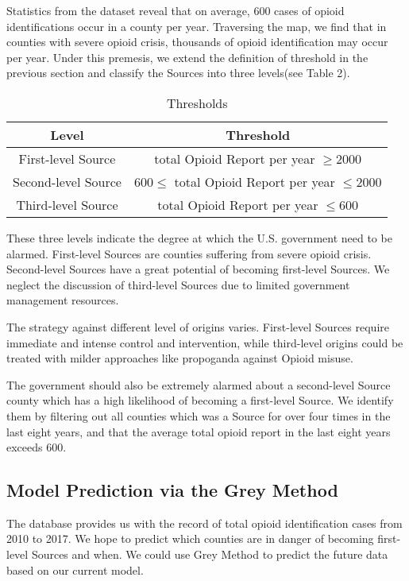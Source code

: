 Statistics from the dataset reveal that on average, 600 cases of opioid identifications occur in a county per year. Traversing the map, we find that in counties with severe opioid crisis, thousands of opioid identification may occur per year. Under this premesis, we extend the definition of threshold in the previous section and classify the Sources into three levels(see Table 2).


\begin{table}[H]
	\centering
	\begin{tabular}{|c|c|}
		\hline
		\rowcolor[HTML]{656565} 
		{\color[HTML]{FFFFFF} \textbf{Level}} & {\color[HTML]{FFFFFF} \textbf{Threshold}} \\ \hline
		First-level Source  & total Opioid Report per year $\geq 2000$ \\ \hline
		Second-level Source & $600 \leq$ total Opioid Report per year $\leq 2000$ \\ \hline
		Third-level Source  & total Opioid Report per year $\leq 600$ \\ \hline
	\end{tabular}
	\caption{Thresholds}
\end{table}

These three levels indicate the degree at which the U.S. government need to be alarmed. First-level Sources are counties suffering from severe opioid crisis. Second-level Sources have a great potential of becoming first-level Sources. We neglect the discussion of third-level Sources due to limited government management resources.

The strategy against different level of origins varies. First-level Sources require immediate and intense control and intervention, while third-level origins could be treated with milder approaches like propoganda against Opioid misuse. 

The government should also be extremely alarmed about a second-level Source county which has a high likelihood of becoming a first-level Source. We identify them by filtering out all counties which was a Source for over four times in the last eight years, and that the average total opioid report in the last eight years exceeds 600.


\subsection{Model Prediction via the Grey Method}
The database provides us with the record of total opioid identification cases from 2010 to 2017. We hope to predict which counties are in danger of becoming first-level Sources and when. We could use Grey Method to predict the future data based on our current model.

